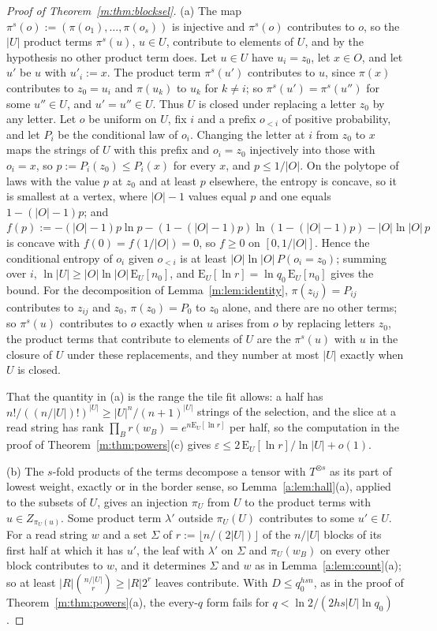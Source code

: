 \documentclass[11pt]{article}
\theoremstyle{definition}
\theoremstyle{remark}
\begin{document}
\begin{proof}[Proof of Theorem~\ref{m:thm:blocksel}]
(a) The map $\pi^s(o):=(\pi(o_1),\dots,\pi(o_s))$ is injective and $\pi^s(o)$ contributes to $o$, so the $|U|$ product terms $\pi^s(u)$, $u\in U$, contribute to elements of $U$, and by the hypothesis no other product term does. Let $u\in U$ have $u_i=z_0$, let $x\in O$, and let $u'$ be $u$ with $u'_i:=x$. The product term $\pi^s(u')$ contributes to $u$, since $\pi(x)$ contributes to $z_0=u_i$ and $\pi(u_k)$ to $u_k$ for $k\ne i$; so $\pi^s(u')=\pi^s(u'')$ for some $u''\in U$, and $u'=u''\in U$. Thus $U$ is closed under replacing a letter $z_0$ by any letter. Let $o$ be uniform on $U$, fix $i$ and a prefix $o_{<i}$ of positive probability, and let $P_i$ be the conditional law of $o_i$. Changing the letter at $i$ from $z_0$ to $x$ maps the strings of $U$ with this prefix and $o_i=z_0$ injectively into those with $o_i=x$, so $p:=P_i(z_0)\le P_i(x)$ for every $x$, and $p\le1/|O|$. On the polytope of laws with the value $p$ at $z_0$ and at least $p$ elsewhere, the entropy is concave, so it is smallest at a vertex, where $|O|-1$ values equal $p$ and one equals $1-(|O|-1)p$; and $f(p):=-(|O|-1)p\ln p-(1-(|O|-1)p)\ln(1-(|O|-1)p)-|O|\ln|O|\,p$ is concave with $f(0)=f(1/|O|)=0$, so $f\ge0$ on $[0,1/|O|]$. Hence the conditional entropy of $o_i$ given $o_{<i}$ is at least $|O|\ln|O|\,P(o_i=z_0)$; summing over $i$, $\ln|U|\ge|O|\ln|O|\,\mathrm E_U[n_0]$, and $\mathrm E_U[\ln r]=\ln q_0\,\mathrm E_U[n_0]$ gives the bound. For the decomposition of Lemma~\ref{m:lem:identity}, $\pi(z_{ij})=P_{ij}$ contributes to $z_{ij}$ and $z_0$, $\pi(z_0)=P_0$ to $z_0$ alone, and there are no other terms; so $\pi^s(u)$ contributes to $o$ exactly when $u$ arises from $o$ by replacing letters $z_0$, the product terms that contribute to elements of $U$ are the $\pi^s(u)$ with $u$ in the closure of $U$ under these replacements, and they number at most $|U|$ exactly when $U$ is closed.

That the quantity in (a) is the range the tile fit allows: a half has $n!/((n/|U|)!)^{|U|}\ge|U|^n/(n+1)^{|U|}$ strings of the selection, and the slice at a read string has rank $\prod_Br(w_B)=e^{n\mathrm E_U[\ln r]}$ per half, so the computation in the proof of Theorem~\ref{m:thm:powers}(c) gives $\varepsilon\le2\,\mathrm E_U[\ln r]/\ln|U|+o(1)$.

(b) The $s$-fold products of the terms decompose a tensor with $T^{\otimes s}$ as its part of lowest weight, exactly or in the border sense, so Lemma~\ref{a:lem:hall}(a), applied to the subsets of $U$, gives an injection $\pi_U$ from $U$ to the product terms with $u\in Z_{\pi_U(u)}$. Some product term $\lambda'$ outside $\pi_U(U)$ contributes to some $u'\in U$. For a read string $w$ and a set $\Sigma$ of $r:=\lfloor n/(2|U|)\rfloor$ of the $n/|U|$ blocks of its first half at which it has $u'$, the leaf with $\lambda'$ on $\Sigma$ and $\pi_U(w_B)$ on every other block contributes to $w$, and it determines $\Sigma$ and $w$ as in Lemma~\ref{a:lem:count}(a); so at least $|R|\binom{n/|U|}r\ge|R|2^r$ leaves contribute. With $D\le q_0^{hsn}$, as in the proof of Theorem~\ref{m:thm:powers}(a), the every-$q$ form fails for $q<\ln2/(2hs|U|\ln q_0)$.
\end{proof}
\end{document}
